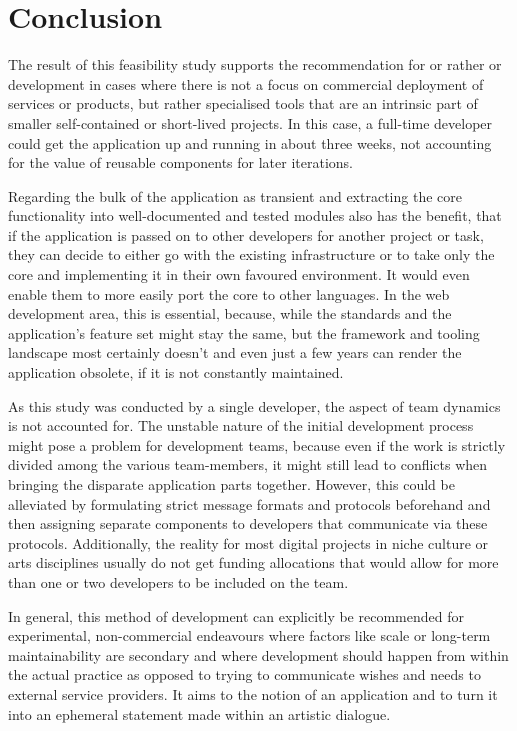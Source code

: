 \chapter{Conclusion}

The result of this feasibility study supports the recommendation for  or rather  or  development in cases where there is not a focus on commercial deployment of services or products, but rather specialised tools that are an intrinsic part of smaller self-contained or short-lived projects. In this case, a full-time developer could get the application up and running in about three weeks, not accounting for the value of reusable components for later iterations.

Regarding the bulk of the application as transient and extracting the core functionality into well-documented and tested modules also has the benefit, that if the application is passed on to other developers for another project or task, they can decide to either go with the existing infrastructure or to take only the core and implementing it in their own favoured environment. It would even enable them to more easily port the core to other languages. In the web development area, this is essential, because, while the standards and the application's feature set might stay the same, but the framework and tooling landscape most certainly doesn't and even just a few years can render the application obsolete, if it is not constantly maintained.

As this study was conducted by a single developer, the aspect of team dynamics is not accounted for. The unstable nature of the initial development process might pose a problem for development teams, because even if the work is strictly divided among the various team-members, it might still lead to conflicts when bringing the disparate application parts together. However, this could be alleviated by formulating strict message formats and protocols beforehand and then assigning separate components to developers that communicate via these protocols. Additionally, the reality for most digital projects in niche culture or arts disciplines usually do not get funding allocations that would allow for more than one or two developers to be included on the team.

In general, this method of development can explicitly be recommended for experimental, non-commercial endeavours where factors like scale or long-term maintainability are secondary and where development should happen from within the actual practice as opposed to trying to communicate wishes and needs to external service providers. It aims to  the notion of an application and to turn it into an ephemeral statement made within an artistic dialogue.

